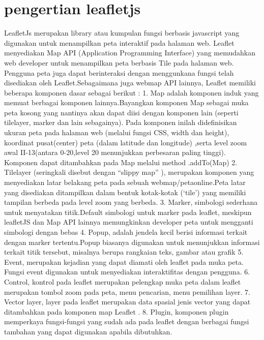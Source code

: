 \section{pengertian leafletjs}
LeafletJs merupakan  library  atau  kumpulan  fungsi  berbasis  javascript yang  digunakan  untuk  menampilkan  peta  interaktif  pada  halaman  web. Leaflet menyediakan  Map  API  (Application  Programming  Interface)  yang  memudahkan web   developer   untuk   menampilkan   peta   berbasis   Tile   pada   halaman   web. Pengguna   peta   juga   dapat   berinteraksi   dengan   menggunkana   fungsi   telah disediakan oleh Leaflet.Sebagaimana juga webmap API lainnya, Leaflet memiliki beberapa komponen dasar sebagai berikut :
1. Map  adalah  komponen  induk  yang  memuat  berbagai komponen  lainnya.Bayangkan komponen Map sebagai muka peta kosong yang nantinya akan dapat  diisi  dengan  komponen  lain  (seperti  tilelayer, marker  dan  lain sebagainya). Pada   komponen   inilah   didefinisikan   ukuran   peta   pada halaman   web   (melalui   fungsi   CSS, width   dan   height),  koordinat pusat(center)  peta  (dalam  latitude  dan  longitude)  ,serta  level  zoom  awal II-13(antara 0-20,level  20  menunjukkan  perbesaran  paling  tinggi). Komponen dapat ditambahkan pada Map melalui method .addTo(Map)
2. Tilelayer   (seringkali   disebut  dengan  “slippy  map” ),   merupakan komponen    yang    menyediakan    latar    belakang    peta    pada    sebuah webmap/petaonline.Peta  latar  yang  disediakan  ditampilkan  dalam  bentuk kotak-kotak (‘tile’) yang memiliki tampilan berbeda pada level zoom yang berbeda.
3. Marker,  simbologi  sederhana  untuk  menyatakan  titik.Default  simbologi untuk  marker  pada  leaflet,  meskipun  leafletJS  dan  Map  API  lainnya memungkinkan developer peta untuk mengganti simbologi dengan bebas
4. Popup, adalah jendela kecil berisi informasi terkait dengan marker tertentu.Popup  biasanya  digunakan  untuk  menunjukkan  informasi  terkait  titik tersebut, misalnya berupa rangkaian teks, gambar atau grafik
5. Event, merupakan kejadian yang dapat diamati oleh leaflet pada muka peta. Fungsi    event    digunakan    untuk    menyediakan    interaktifitas    dengan pengguna.
6. Control,  kontrol  pada  leaflet  merupakan  pelengkap  muka  peta  dalam leaflet   merupakan   tombol   zoom   pada   peta, menu   pencarian, menu pemilihan layer.
7. Vector  layer,  layer  pada  leaflet  merupakan  data  spasial  jenis  vector  yang dapat ditambahkan pada komponen map Leaflet .
8. Plugin, komponen plugin memperkaya fungsi-fungsi yang sudah ada pada leaflet dengan berbagai fungsi tambahan yang dapat digunakan apabila dibutuhkan.


